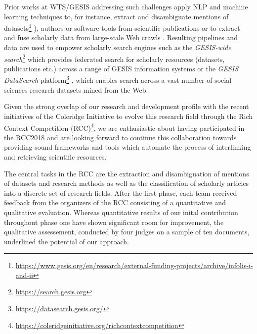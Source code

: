 Prior works at WTS/GESIS addressing such challenges apply NLP and machine learning techniques to, for instance, extract and disambiguate mentions of datasets\footnote{\url{https://www.gesis.org/en/research/external-funding-projects/archive/infolis-i-and-ii}} \cite{boland2012identifying,ghavimi2016semi}), authors \cite{conf/cikm/Backes18, conf/jcdl/Backes18} or software tools \cite{boland2019distant} from scientific publications or to extract and fuse scholarly data from large-scale Web crawls \cite{journals/semweb/YuGFLRD19, sahoo2015analysing}. Resulting pipelines and data are used to empower scholarly search engines such as the \textit{GESIS-wide search}\footnote{\url{https://search.gesis.org}}  \cite{conf/jcdl/HienertKBZM19} which provides federated search for scholarly resources (datasets, publications etc.) across a range of GESIS information systems or the \textit{GESIS DataSearch} platform\footnote{\url{https://datasearch.gesis.org/}} \cite{Krmer2018ADD}, which enables search across a vast number of social sciences research datasets mined from the Web. 

Given the strong overlap of our research and development profile with the recent initiatives of the Coleridge Initiative to evolve this research field through the Rich Context Competition (RCC)\footnote{\url{https://coleridgeinitiative.org/richcontextcompetition}}, we are enthusiastic about having participated in the RCC2018 and are looking forward to continue this collaboration towards providing sound frameworks and tools which automate the process of interlinking and retrieving scientific resources.

The central tasks in the RCC are the extraction and disambiguation of mentions of datasets and research methods as well as the classification of scholarly articles into a discrete set of research fields. After the first phase, each team received feedback from the organizers of the RCC consisting of a quantitative and qualitative evaluation. Whereas quantitative results of our inital contribution throughout phase one have shown significant room for improvement, the qualitative assessement, conducted by four judges on a sample of ten documents, underlined the potential of our approach. 



